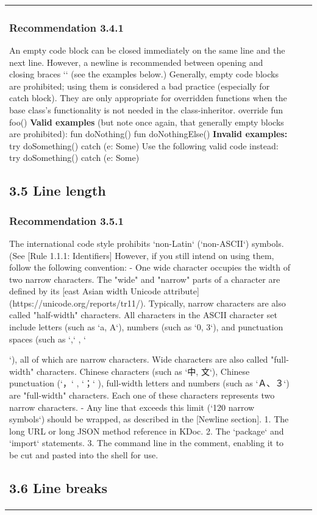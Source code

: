 \begin{center}
\begin{tabular}{ |p{}|p{}|p{}| }
\subsubsection*{\textbf{Recommendation 3.4.1}}
An empty code block can be closed immediately on the same line and the next line. However, a newline is recommended between opening and closing braces `{}` (see the examples below.)
Generally, empty code blocks are prohibited; using them is considered a bad practice (especially for catch block).
They are only appropriate for overridden functions when the base class's functionality is not needed in the class-inheritor.
override fun foo() {
}
\textbf{Valid examples} (but note once again, that generally empty blocks are prohibited):
fun doNothing() {}
fun doNothingElse() {
}
\textbf{Invalid examples:}
try {
  doSomething()
} catch (e: Some) {}
Use the following valid code instead:
try {
   doSomething()
} catch (e: Some) {
}
\subsection*{\textbf{3.5 Line length}}
\subsubsection*{\textbf{Recommendation 3.5.1}}
The international code style prohibits `non-Latin` (`non-ASCII`) symbols.
(See [Rule 1.1.1: Identifiers] However, if you still intend on using them, follow the following convention:
- One wide character occupies the width of two narrow characters.
The "wide" and "narrow" parts of a character are defined by its [east Asian width Unicode attribute](https://unicode.org/reports/tr11/).
Typically, narrow characters are also called "half-width" characters.
All characters in the ASCII character set include letters (such as `a, A`), numbers (such as `0, 3`), and punctuation spaces (such as `,` , `{`), all of which are narrow characters.
Wide characters are also called "full-width" characters. Chinese characters (such as `中, 文`), Chinese punctuation (`，` , `；` ), full-width letters and numbers (such as `Ａ、３`) are "full-width" characters.
Each one of these characters represents two narrow characters.
- Any line that exceeds this limit (`120 narrow symbols`) should be wrapped, as described in the [Newline section].
1.	The long URL or long JSON method reference in KDoc.
2.	The `package` and `import` statements.
3.	The command line in the comment, enabling it to be cut and pasted into the shell for use.
\subsection*{\textbf{3.6 Line breaks}}
}
\end{tabular}
\end{center}
